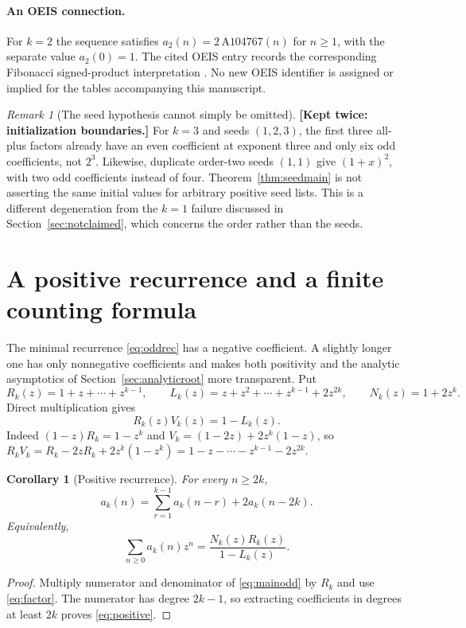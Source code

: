 \documentclass[11pt,letterpaper]{article}
\numberwithin{equation}{section}
\newtheorem{corollary}[theorem]{Corollary}
\theoremstyle{definition}
\theoremstyle{remark}
\newtheorem{remark}[theorem]{Remark}
\begin{document}
\paragraph{An OEIS connection.}
For $k=2$ the sequence satisfies $a_2(n)=2\,\mathrm{A}104767(n)$ for
$n\ge1$, with the separate value $a_2(0)=1$. The cited OEIS entry records
the corresponding Fibonacci signed-product interpretation \cite{OEIS}.
No new OEIS identifier is assigned or implied for the tables accompanying
this manuscript.

\begin{remark}[The seed hypothesis cannot simply be omitted]
\label{rem:seedhyp}
\textbf{[Kept twice: initialization boundaries.]}
For $k=3$ and seeds $(1,2,3)$, the first three all-plus factors already
have an even coefficient at exponent three and only six odd coefficients,
not $2^3$. Likewise, duplicate order-two seeds $(1,1)$ give $(1+x)^2$, with
two odd coefficients instead of four. Theorem~\ref{thm:seedmain} is not
asserting the same initial values for arbitrary positive seed lists.
This is a different degeneration from the $k=1$ failure discussed in
Section~\ref{sec:notclaimed}, which concerns the order rather than the
seeds.
\end{remark}

\section{A positive recurrence and a finite counting formula}
\label{sec:positive}

The minimal recurrence \eqref{eq:oddrec} has a negative coefficient. A
slightly longer one has only nonnegative coefficients and makes both
positivity and the analytic asymptotics of Section~\ref{sec:analyticroot}
more transparent. Put
\[
 R_k(z)=1+z+\cdots+z^{k-1},\qquad
 L_k(z)=z+z^2+\cdots+z^{k-1}+2z^{2k},\qquad
 N_k(z)=1+2z^k .
\]
Direct multiplication gives
\begin{equation}
 R_k(z)V_k(z)=1-L_k(z).
 \label{eq:factor}
\end{equation}
Indeed $(1-z)R_k=1-z^k$ and $V_k=(1-2z)+2z^k(1-z)$, so
$R_kV_k=R_k-2zR_k+2z^k(1-z^k)=1-z-\cdots-z^{k-1}-2z^{2k}$.

\begin{corollary}[Positive recurrence]
\label{cor:positive}
For every $n\ge2k$,
\begin{equation}
 a_k(n)=\sum_{r=1}^{k-1}a_k(n-r)+2a_k(n-2k).
 \label{eq:positive}
\end{equation}
Equivalently,
\begin{equation}
 \sum_{n\ge0}a_k(n)z^n=\frac{N_k(z)R_k(z)}{1-L_k(z)} .
 \label{eq:positiveGF}
\end{equation}
\end{corollary}
\begin{proof}
Multiply numerator and denominator of \eqref{eq:mainodd} by $R_k$ and use
\eqref{eq:factor}. The numerator has degree $2k-1$, so extracting
coefficients in degrees at least $2k$ proves \eqref{eq:positive}.
\end{proof}
\end{document}
